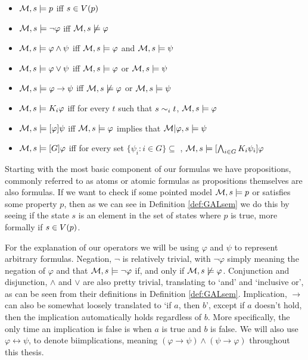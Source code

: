 \begin{definition} \hfill
	\label{def:GALsem}
	\begin{itemize}
		\item[] $\mathcal{M},s \models p $ iff $ s \in V(p)$
		\item[] $\mathcal{M},s \models \neg\varphi$ iff $ \mathcal{M},s \not\models \varphi$
		\item[] $\mathcal{M},s \models \varphi \wedge \psi $ iff $ \mathcal{M},s \models \varphi $ and $ \mathcal{M},s \models \psi$
		\item[] $\mathcal{M},s \models \varphi \vee \psi $ iff $ \mathcal{M},s \models \varphi $ or $ \mathcal{M},s \models \psi$
		\item[] $\mathcal{M},s \models \varphi \rightarrow \psi $ iff $ \mathcal{M},s \not\models \varphi $ or $ \mathcal{M},s \models \psi$
		\item[] $\mathcal{M},s \models K_i\varphi $ iff for every $t$ such that $s\sim_{i}t$, $\mathcal{M},s \models \varphi$
		\item[] $\mathcal{M},s \models [\varphi]\psi $ iff $ \mathcal{M},s \models \varphi $ implies that $ \mathcal{M}|\varphi,s \models \psi$
		\item[] $\mathcal{M},s \models [G]\varphi $ iff for every set $\{\psi_i: i \in G\} \subseteq $ , $ \mathcal{M},s \models [\bigwedge_{i\in G}K_i\psi_i]\varphi$ 
	\end{itemize}
\end{definition}


Starting with the most basic component of our formulas we have propositions, commonly referred to as atoms or atomic formulas as propositions themselves are also formulas. If we want to check if some pointed model $\mathcal{M},s \models p$ or satisfies some property $p$, then as we can see in Definition \ref{def:GALsem} we do this by seeing if the state $s$ is an element in the set of states where $p$ is true, more formally if $s \in V(p)$. 

For the explanation of our operators we will be using $\varphi$ and $\psi$ to represent arbitrary formulas. Negation, $\neg$ is relatively trivial, with $\neg\varphi$ simply meaning the negation of $\varphi$ and that $\mathcal{M},s \models \neg\varphi$ if, and only if $\mathcal{M},s \not\models\varphi$. Conjunction and disjunction, $\wedge$ and $\vee$ are also pretty trivial, translating to `and' and `inclusive or', as can be seen from their definitions in Definition \ref{def:GALsem}. Implication, $\rightarrow$ can also be somewhat loosely translated to `if $a$, then $b$', except if $a$ doesn't hold, then the implication automatically holds regardless of $b$. More specifically, the only time an implication is false is when $a$ is true and $b$ is false. We will also use $\varphi \leftrightarrow \psi$, to denote biimplications, meaning $(\varphi \rightarrow \psi) \wedge (\psi \rightarrow \varphi)$ throughout this thesis. 

